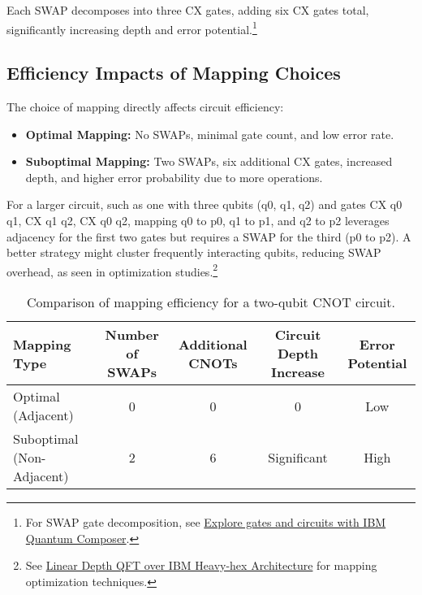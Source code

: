 {  Each SWAP decomposes into three CX gates, adding six CX gates total,
  significantly increasing depth and error potential.\footnote{For SWAP gate
    decomposition, see \href{https://learning.quantum.ibm.com/tutorial/explore-gates-and-circuits-with-the-quantum-composer}
  {Explore gates and circuits with IBM Quantum Composer}.}
}

\subsection*{Efficiency Impacts of Mapping Choices}

The choice of mapping directly affects circuit efficiency:

\begin{itemize}
  \item \textbf{Optimal Mapping:} No SWAPs, minimal gate count, and low error
    rate.
  \item \textbf{Suboptimal Mapping:} Two SWAPs, six additional CX gates,
    increased depth, and higher error probability due to more operations.
\end{itemize}

\vspace{0.3cm}

\noindent
For a larger circuit, such as one with three qubits (q0, q1, q2) and gates CX
q0 q1, CX q1 q2, CX q0 q2, mapping q0 to p0, q1 to p1, and q2 to p2 leverages
adjacency for the first two gates but requires a SWAP for the third (p0 to
p2). A better strategy might cluster frequently interacting qubits, reducing
SWAP overhead, as seen in optimization studies.\footnote{See
  \href{https://arxiv.org/html/2402.09705v1}{Linear Depth QFT over IBM
Heavy-hex Architecture} for mapping optimization techniques.}

\vspace{0.3cm}

\begin{center}
  \begin{table}[h]
    \centering
    \begin{tabular}{lcccc}
      \toprule
      Mapping Type & Number of SWAPs & Additional CNOTs & Circuit Depth Increase & Error Potential \\
      \midrule
      Optimal (Adjacent) & 0 & 0 & 0 & Low \\
      Suboptimal (Non-Adjacent) & 2 & 6 & Significant & High \\
      \bottomrule
    \end{tabular}
    \caption{Comparison of mapping efficiency for a two-qubit CNOT circuit.}
  \end{table}
\end{center}

